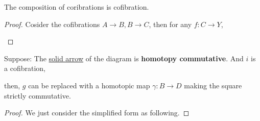 \documentclass[Total.tex]{subfiles}
\begin{document}
				\begin{proposition}
					The composition of coribrations is cofibration.
				\end{proposition}
				\begin{proof}
					Cosider the cofibrations $A\rightarrow B,B\rightarrow C$, then for any $f:C\rightarrow Y$,
					
					\begin{center}
					\end{center}
				\end{proof}
				
				\begin{proposition}
					Suppose: The \underline{solid arrow} of the diagram is \textbf{homotopy commutative}. And $i$ is a cofibration,
					\begin{center}
					\end{center}
					
					then, $g$ can be replaced with a homotopic map $\gamma:B\rightarrow D$ making the square strictly commutative.
				\end{proposition}
				\begin{proof}
					We just consider the simplified form as following.
				\end{proof}
				
\end{document}
